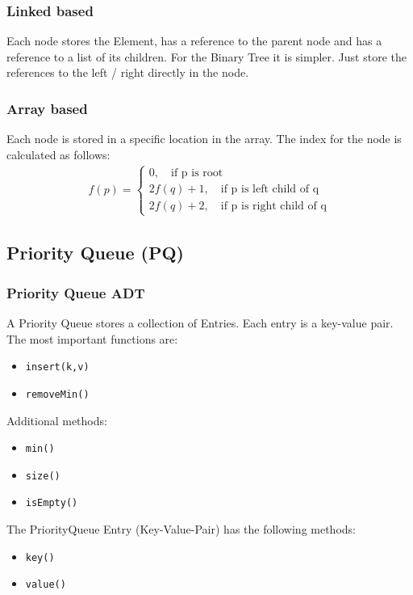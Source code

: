 \documentclass[11pt,twoside,landscape]{article}
\begin{document}
\begin{multicols}{2}
\subsubsection*{Linked based}
\label{sec:org611759e}
Each node stores the Element, has a reference to the parent node and has a reference to a list of its children. For the Binary Tree it is simpler. Just store the references to the left / right directly in the node.

\subsubsection*{Array based}
\label{sec:org9630749}
Each node is stored in a specific location in the array. The index for the node is calculated as follows:
\begin{align*}
f(p) = \begin{cases}
0, \quad \text{if p is root} \\
2f(q) + 1, \quad \text{if p is left child of q} \\
2f(q) + 2, \quad \text{if p is right child of q}
\end{cases}
\end{align*}

\subsection*{Priority Queue (PQ)}
\label{sec:org5d6b6ec}
\subsubsection*{Priority Queue ADT}
\label{sec:org135d613}
A Priority Queue stores a collection of Entries. Each entry is a key-value pair. The most important functions are:
\begin{itemize}
\item \texttt{insert(k,v)}
\item \texttt{removeMin()}
\end{itemize}

Additional methods:
\begin{itemize}
\item \texttt{min()}
\item \texttt{size()}
\item \texttt{isEmpty()}
\end{itemize}

The PriorityQueue Entry (Key-Value-Pair) has the following methods:
\begin{itemize}
\item \texttt{key()}
\item \texttt{value()}
\end{itemize}


\end{multicols}
\end{document}
